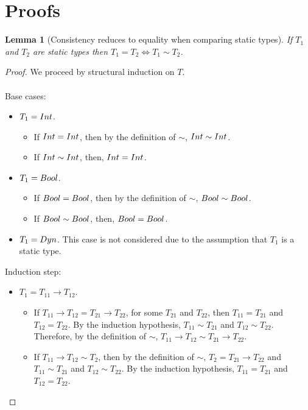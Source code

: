 \documentclass[a4paper]{article}
\newtheorem{lemma}{Lemma}
\begin{document}
\newpage

\section{Proofs}
\begin{lemma}[Consistency reduces to equality when comparing static types]
\label{consistencytoequality}
If $T_1$ and $T_2$ are static types then $T_1 = T_2 \iff T_1 \sim T_2$.
\end{lemma}
\begin{proof}
We proceed by structural induction on $T$.\\\\
Base cases:
\begin{itemize}
    \item $T_1 = {Int}$.
    \begin{itemize}
        \item If ${Int} = {Int}$, then by the definition of $\sim$, ${Int} \sim {\ensuremath{Int}}$.
        \item If ${Int} \sim {\ensuremath{Int}}$, then, ${Int} = {Int}$.
    \end{itemize}
    \item $T_1 = Bool$.
    \begin{itemize}
        \item If $Bool = Bool$, then by the definition of $\sim$, $Bool \sim Bool$.
        \item If $Bool \sim Bool$, then, $Bool = Bool$.
    \end{itemize}
    \item $T_1 = Dyn$.
    This case is not considered due to the assumption that $T_1$ is a static type.
\end{itemize}
Induction step:
\begin{itemize}
    \item $T_1 = T_{11} \rightarrow T_{12}$.
    \begin{itemize}
        \item If $T_{11} \rightarrow T_{12} = T_{21} \rightarrow T_{22}$, for some $T_{21}$ and $T_{22}$, then $T_{11} = T_{21}$ and $T_{12} = T_{22}$.
        By the induction hypothesis, $T_{11} \sim T_{21}$ and $T_{12} \sim T_{22}$.
        Therefore, by the definition of $\sim$, $T_{11} \rightarrow T_{12} \sim T_{21} \rightarrow T_{22}$.
        \item If $T_{11} \rightarrow T_{12} \sim T_2$, then by the definition of $\sim$, $T_2 = T_{21} \rightarrow T_{22}$ and $T_{11} \sim T_{21}$ and $T_{12} \sim T_{22}$.
        By the induction hypothesis, $T_{11} = T_{21}$ and $T_{12} = T_{22}$.

\end{itemize}
\end{itemize}
\end{proof}
\end{document}

